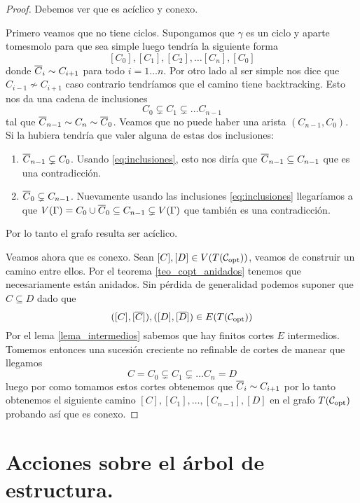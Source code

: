 \documentclass[tesis.tex]{subfiles}
\begin{document}
\begin{proof}
	Debemos ver que es acíclico y conexo.
	
	Primero veamos que no tiene ciclos.
	Supongamos que $\gamma$	es un ciclo y aparte tomesmolo para que sea simple luego tendría la siguiente forma
	\[
		[C_0], [C_1], [C_2], \dots [C_{n}], [C_0]
	\]
	donde $\overline C_{i} \sim C_{i+1}$ para todo $i=1 \dots n$.
	Por otro lado al ser simple nos dice que $C_{i-1} \nsim C_{i+1}$ caso contrario tendríamos que el camino tiene backtracking.
	Esto nos da una cadena de inclusiones
	\begin{equation}\label{eq:inclusiones}
			C_0 \subsetneq C_1 \subsetneq \dots C_{n-1}
	\end{equation}
	tal que $\overline C_{n-1} \sim C_n \sim \overline C_0$.
	Veamos que no puede haber una arista $(C_{n-1}, C_0)$.
	Si la hubiera tendría que valer alguna de estas dos inclusiones:
	\begin{enumerate}
		\item $\overline C_{n-1} \subsetneq C_0$.
		Usando \ref{eq:inclusiones}, esto nos diría que $\overline C_{n-1} \subseteq C_{n-1}$ que es una contradicción.
		\item $\overline C_{0} \subsetneq C_{n-1}$.
		Nuevamente usando las inclusiones \ref{eq:inclusiones} llegaríamos a que $V(\Gamma) = C_0 \cup \overline C_0 \subseteq C_{n-1} \subsetneq V(\Gamma)$ que también es una contradicción.
	\end{enumerate}
	Por lo tanto el grafo resulta ser acíclico.
	
	Veamos ahora que es conexo.
	Sean $[C], [D] \in V(T({\cal C}_{\text{opt}}))$, veamos de construir un camino entre ellos.
	Por el teorema \ref{teo_copt_anidados} tenemos que necesariamente están anidados.
	Sin pérdida de generalidad podemos suponer que $C \subseteq D$ dado que
	\[
	([C], [\overline C]), ([D],[\overline D]) \in E(T({\cal C}_{\text{opt}}))
	\]
	Por el lema \ref{lema_intermedios} sabemos que hay finitos cortes $E$ intermedios.
	Tomemos entonces una sucesión creciente no refinable de cortes de manear que llegamos 
	\[
		C=C_0 \subsetneq C_1 \subsetneq \dots C_n = D
	\]
	luego por como tomamos estos cortes obtenemos que $\overline C_i \sim C_{i+1}$ por lo tanto obtenemos el siguiente camino $[C],[C_1], \dots, [C_{n-1}],[D]$ en el grafo $T({\cal C}_{\text{opt}})$ probando así que es conexo.	
\end{proof}

\section{Acciones sobre el árbol de estructura.}
\end{document}
